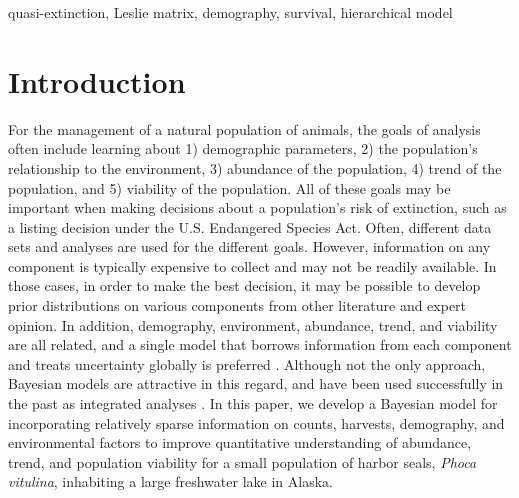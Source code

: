 \documentclass[]{risa}\usepackage[]{graphicx}\usepackage[]{color}
\begin{document}
\begin{keywords}
quasi-extinction, Leslie matrix, demography, survival, hierarchical model
\end{keywords}

\maketitle


\section{Introduction}
\label{sec:intro}
For the management of a natural population of animals, the goals of analysis often include learning about 1) demographic parameters, 2) the population's relationship to the environment, 3) abundance of the population, 4) trend of the population, and 5) viability of the population. All of these goals may be important when making decisions about a population's risk of extinction, such as a listing decision under the U.S. Endangered Species Act. Often, different data sets and analyses are used for the different goals.  However, information on any component is typically expensive to collect and may not be readily available.  In those cases, in order to make the best decision, it may be possible to develop prior distributions on various components from other literature and expert opinion.  In addition, demography, environment, abundance, trend, and viability are all related, and a single model that borrows information from each component and treats uncertainty globally is preferred \citep{Good:meth:2004}.  Although not the only approach, Bayesian models are attractive in this regard, and have been used successfully in the past as integrated analyses \citep{Good:pred:2002, Wade:Baye:2002, Maun:popu:2004}. In this paper, we develop a Bayesian model for incorporating relatively sparse information on counts, harvests, demography, and environmental factors to improve quantitative understanding of abundance, trend, and population viability for a small population of harbor seals, \emph{Phoca vitulina}, inhabiting a large freshwater lake in Alaska.
\end{document}
